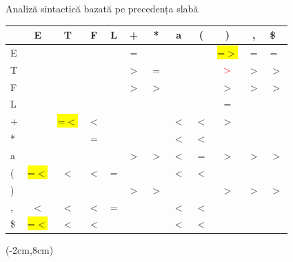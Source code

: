 \documentclass[pdf]{beamer}
\begin{document}
\begin{frame}{Analiză sintactică bazată pe precedența slabă}

\footnotesize
\center
\begin{tabular}{| l | c | c | c | c | c | c  | c | c | c | c | l|}
    \hline 
    &\color{blue}  E & \color{blue} T &\color{blue}  F & \color{blue} L & \color{blue} + &\color{blue}  * &\color{blue}  a &\color{blue}  ( & \color{blue} ) & \color{blue} , &\color{blue} \$  \\
     \hline
   \color{blue}   E &  & & & &\color{red} =  & &  & &\color{red} \colorbox{yellow} {=$>$} &\color{red}  = & \color{red}=\\
     \hline
   \color{blue}   T &  &  &  &  & \color{red}$>$ &\color{red} = &  &  & $\color{red}>$&\color{red}$>$  &\color{red}$>$ \\
     \hline
    \color{blue}  F &  &  &  &  & \color{red}$>$ & \color{red}$>$ &  &  &\color{red}$>$&\color{red}$>$ &\color{red}$>$\\
     \hline
    \color{blue}  L &  &  &  &  &  &  &   &  & \color{red}= & &\\
     \hline
    \color{blue}  + &  &\color{red} \colorbox{yellow}{=$<$} &\color{red} $<$  &  &  & &\color{red}$<$ &\color{red}\color{red}$<$ &\color{red} $>$ & &\\
     \hline
    \color{blue}  * & &  & \color{red}= &  &  &  &\color{red} $<$  &\color{red} $<$ & & &\\
     \hline
    \color{blue}  a &  &   &   &   & \color{red}$>$  &\color{red} $>$ &\color{red} $<$ & = &\color{red} $>$& \color{red}$>$&\color{red}$>$\\
    \hline
    \color{blue}  ( & \color{red} \colorbox{yellow} {=$<$} & \color{red}$<$ & \color{red} $<$ &\color{red} =  &   &  &\color{red} $<$  &\color{red} $<$  & & &\\
    \hline
    \color{blue}  ) &   &   &   &   &\color{red} $>$  & \color{red}$>$ &  &  &\color{red} $>$&\color{red} $>$&\color{red}$>$\\
    \hline
    \color{blue}  , & \color{red} $<$  & \color{red} $<$ &\color{red} $<$  & \color{red}=  &   &  & \color{red}$<$ & \color{red} $<$ & & &\\
    \hline
    \color{blue}  \$ & \color{red} \colorbox{yellow} {=$<$} &\color{red}  $<$ &\color{red}  $<$ &   &   &  &\color{red} $<$ & \color{red}$<$ & & &\\
    \hline
\end{tabular}

\begin{textblock*}{16cm}(-2cm,8cm) 
\end{textblock*}
\end{frame}
\end{document}
